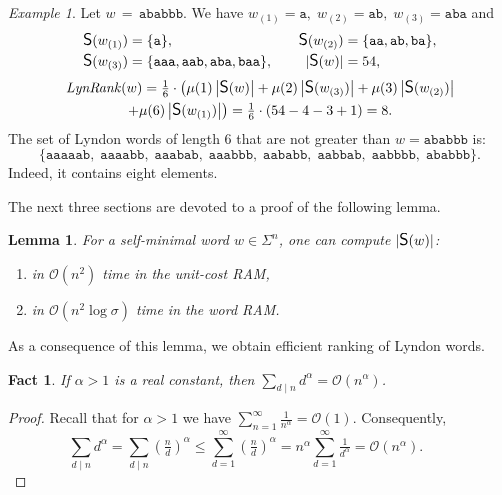\documentclass{article}
\newcommand{\mayqed}{}
\newcommand{\Oh}{\mathcal{O}}
\newcommand{\CS}{\mbox{\large{\sf{S}}}}
\newcommand{\Lynd}{\mathit{LynRank}}
\newtheorem{lemma}[theorem]{Lemma}
\newtheorem{fact}[theorem]{Fact}
\theoremstyle{definition}
\theoremstyle{remark}
\newtheorem{example}[theorem]{Example}
\begin{document}
\begin{example}
  Let $w\,=\,\texttt{ababbb}$. We have  $w_{(1)}=\texttt{a},\; w_{(2)}=\texttt{ab},\; w_{(3)}=\texttt{aba}$ and 
  \begin{align*}
    \CS(w_{(1)})&=\{\texttt{a}\},&\quad \CS(w_{(2)})&=\{\texttt{aa},\texttt{ab},\texttt{ba}\},\\
    \CS(w_{(3)})&=\{\texttt{aaa},\texttt{aab},\texttt{aba},\texttt{baa}\},&\quad |\CS(w)|&=54,
  \end{align*}
  \begin{multline*}
    \Lynd(w)=  \tfrac{1}{6}\cdot \bigl(\mu(1) \left|\CS(w)\right|+\mu(2)\left|\CS(w_{(3)})\right|+ \mu(3)\left|\CS(w_{(2)})\right|\\+\mu(6)\left|\CS(w_{(1)})\right|\bigr)
    =  \tfrac{1}{6}\cdot (54-4-3+1)=8.
  \end{multline*}
  The set of Lyndon words of length $6$ that are not greater than $w=\texttt{ababbb}$ is:
  $$\{\mathtt{aaaaab},\; \mathtt{aaaabb},\; \mathtt{aaabab},\; \mathtt{aaabbb},\; \mathtt{aababb},\; \mathtt{aabbab},\; \mathtt{aabbbb},\; \mathtt{ababbb}\}.$$
  Indeed, it contains eight elements.
\end{example}

The next three sections are devoted to a proof of the following lemma.

\begin{lemma}\label{lem:csgen}
  For a self-minimal word $w\in \Sigma^n$, one can compute $|\CS(w)|$:
  \begin{enumerate}[label={(\alph*)}]
    \item\label{aaa} in $\Oh(n^2)$ time in the unit-cost RAM,
    \item\label{bbb} in $\Oh(n^2 \log \sigma)$ time in the word RAM.
  \end{enumerate}
\end{lemma}

\noindent
As a consequence of this lemma, we obtain efficient ranking of Lyndon words.

\begin{fact}\label{fct:div}
  If $\alpha>1$ is a real constant,
  then $\sum_{d \mid n} d^\alpha = \Oh(n^\alpha)$.
\end{fact}
\begin{proof}
  Recall that for $\alpha>1$ we have $\sum_{n=1}^\infty \frac{1}{n^\alpha} = \Oh(1)$. Consequently,
  $$\sum_{d\mid n} d^\alpha = \sum_{d\mid n}\left(\tfrac{n}{d}\right)^\alpha \le \sum_{d=1}^\infty \left(\tfrac{n}{d}\right)^\alpha = n^\alpha \sum_{d=1}^\infty \tfrac{1}{d^\alpha} = \Oh(n^\alpha).\quad\quad$$

\vspace*{-1.1cm}\mayqed\end{proof}
\end{document}
